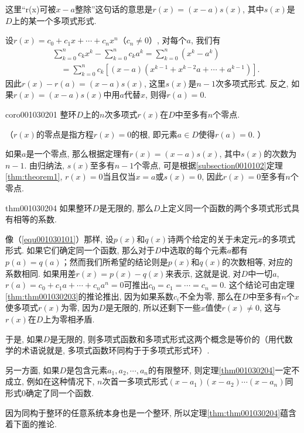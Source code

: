 这里“r(x)可被$x-a$整除”这句话的意思是$r(x)=(x-a)s(x)$, 其中$s(x)$是$D$上的某一个多项式形式. 

设$r(x)=c_0+c_1x+\cdots+c_nx^n$（$c_n \neq 0$）, 对每个$a$, 我们有
\[
\begin{aligned}
&\sum_{k=0}^{n}{c_kx^k}-\sum_{k=0}^{n}{c_ka^k} = \sum_{k=0}^{n}{(x^k-a^k)}\\
&\quad=\sum_{k=0}^{n}{c_k[(x-a)(x^{k-1} + x^{k-2}a + \cdots + a^{k-1})]}.
\end{aligned}
\]
因此$r(x)-r(a)=(x-a)s(x)$, 这里$s(x)$是$n-1$次多项式形式. 反之, 如果$r(x)=(x-a)s(x)$中用$a$代替$x$, 则得$r(a)=0$. 

\begin{corollary}{}{coro001030201}
整环$D$上的$n$次多项式$r(x)$在$D$中至多有$n$个零点. 
\end{corollary}

（$r(x)$的零点是指方程$r(x)=0$的根, 即元素$a \in D$使得$r(a)=0$. ）

如果$a$是一个零点, 那么根据定理有$r(x)=(x-a)s(x)$, 其中$s(x)$的次数为$n-1$. 由归纳法, $s(x)$至多有$n-1$个零点, 可是根据\ref{subsection0010102}定理\ref{thm:theorem1}, $r(x)=0$当且仅当$x=a$或$s(x)=0$, 因此$r(x)=0$至多有$n$个零点. 

\begin{theorem}{}{thm001030204}
如果整环$D$是无限的, 那么$D$上定义同一个函数的两个多项式形式具有相等的系数. 
\end{theorem}

像（\ref{equ001030101}）那样, 设$p(x)$和$q(x)$诗两个给定的关于未定元$x$的多项式形式. 如果它们确定同一个函数, 那么对于$D$中选取的每个元素$a$都有$p(a)=q(a)$；然而我们所希望的结论则是$p(x)$和$q(x)$的次数相等, 对应的系数相同. 如果用差$r(x)=p(x)-q(x)$来表示, 这就是说, 对$D$中一切$a$, $r(a)=c_0+c_1a+\cdots+c_na^n=0$可推出$c_0=c_1=\cdots=c_n=0$. 这个结论可由定理\ref{thm:thm001030203}的推论推出, 因为如果系数$c_i$不全为零, 那么在$D$中至多有$n$个$x$使多项式$r(x)$为零, 因为$D$是无限的, 所以还剩下一些$x$值使$r(x) \neq 0$, 这与$r(x)$在$D$上为零相矛盾. 

于是, 如果$D$是无限的, 则多项式函数和多项式形式这两个概念是等价的（用代数学的术语说就是, 多项式函数环同构于于多项式形式环）. 

另一方面, 如果$D$是包含元素$a_1,a_2,\cdots,a_n$的有限整环, 则定理\ref{thm001030204}一定不成立, 例如在这种情况下, $n$次首一多项式形式$(x-a_1)(x-a_2)\cdots(x-a_n)$同形式0确定了同一个函数. 

因为同构于整环的任意系统本身也是一个整环, 所以定理\ref{thm:thm001030204}蕴含着下面的推论. 

